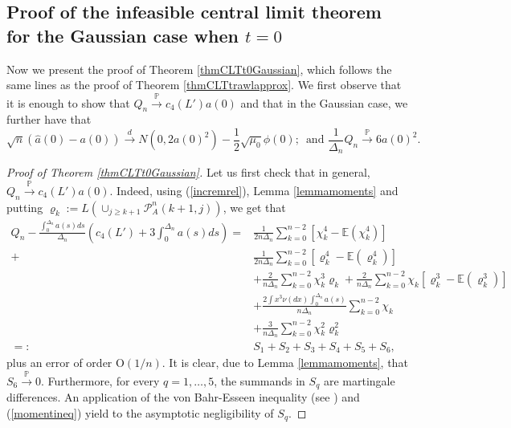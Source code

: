 \documentclass{article}
\theoremstyle{plain}
\theoremstyle{definition}
\theoremstyle{remark}
\begin{document}
\begin{appendix}
\subsection{Proof of the  infeasible central limit theorem for the Gaussian case when $t=0$}\label{sec_proof_t0}
Now we present the  proof of Theorem \ref{thmCLTt0Gaussian}, which follows the same lines
as the proof of Theorem \ref{thmCLTtrawlapprox}. We first observe
that it is enough to show that $Q_{n}\overset{\mathbb{P}}{\rightarrow}c_{4}(L')a(0)$
and that in the Gaussian case, we further have that 
\begin{equation}
	\sqrt{n}\left(\hat{a}(0)-a(0)\right)\overset{d}{\rightarrow}N(0,2a(0)^{2})-\frac{1}{2}\sqrt{\mu_{0}}\phi(0);\,\,\,\text{and }\frac{1}{\Delta_{n}}Q_{n}\overset{\mathbb{P}}{\rightarrow}6a(0)^{2}.\label{eq:whattodothmcltt0}
\end{equation}
\begin{proof}[Proof of Theorem \ref{thmCLTt0Gaussian}] Let us first check that in general, $Q_{n}\overset{\mathbb{P}}{\rightarrow}c_{4}(L')a(0)$.
	Indeed, using (\ref{incremrel}), Lemma \ref{lemmamoments} and
	putting $\varrho_{k}:=L(\cup_{j\geq k+1}\mathcal{P}_{A}^{n}(k+1,j))$,
	we get that 
	\begin{equation}
		\begin{aligned}Q_{n}-\frac{\int_{0}^{\Delta_{n}}a(s)ds}{\Delta_{n}}\left(c_{4}(L')+3\int_{0}^{\Delta_{n}}a(s)ds\right)= & \frac{1}{2n\Delta_{n}}\sum_{k=0}^{n-2}[\chi_{k}^{4}-\mathbb{E}(\chi_{k}^{4})]\\+&\frac{1}{2n\Delta_{n}}\sum_{k=0}^{n-2}[\varrho_{k}^{4}-\mathbb{E}(\varrho_{k}^{4})]\\
			& +\frac{2}{n\Delta_{n}}\sum_{k=0}^{n-2}\chi_{k}^{3}\varrho_{k}+\frac{2}{n\Delta_{n}}\sum_{k=0}^{n-2}\chi_{k}[\varrho_{k}^{3}-\mathbb{E}(\varrho_{k}^{3})]\\
			& +\frac{2\int x^{3}\nu(dx)\int_{0}^{\Delta_{n}}a(s)}{n\Delta_{n}}\sum_{k=0}^{n-2}\chi_{k}\\
			& +\frac{3}{n\Delta_{n}}\sum_{k=0}^{n-2}\chi_{k}^{2}\varrho_{k}^{2}\\
			=: & S_{1}+S_{2}+S_{3}+S_{4}+S_{5}+S_{6},
		\end{aligned}
		\label{eq:quariticydecomp}
	\end{equation}
	plus an error of order $\mathrm{O}(1/n)$. It is clear, due to Lemma
	\ref{lemmamoments}, that $S_{6}\overset{\mathbb{P}}{\rightarrow}0$.
	Furthermore, for every $q=1,\ldots,5$, the summands in $S_{q}$ are
	martingale differences. An application of the von Bahr-Esseen inequality
	(see \citep[9.3.b]{LinBai10}) and (\ref{momentineq}) yield to
	the asymptotic negligibility of $S_{q}$. 
	

\end{proof}
\end{appendix}
\end{document}
